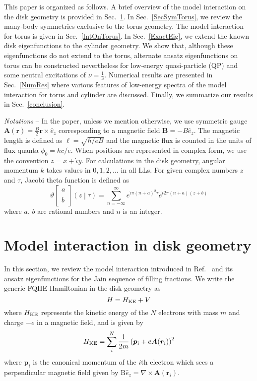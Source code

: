 \documentclass[prb,aps,epsfig,longbibliography,twocolumn]{revtex4-1}
\newcommand{\bsym}[1]{\boldsymbol{#1}}
\newcommand{\rbkt}[1]{\left( #1\right)}
\newcommand{\sbkt}[1]{\left[ #1\right]}
\newcommand{\jbkt}[2]{\left( #1 \middle| #2\right)}
\newcommand{\rtheta}[4]{\vartheta \sbkt{ \substack{{#1} \\ \\{#2}}}	\jbkt{#3}{#4}}
\newcommand{\iiota}{\dot{\iota}}
\begin{document}
This paper is organized as follows. A brief overview of the model interaction on the disk geometry is provided in Sec.~\ref{SecModelInt}. In Sec.~\ref{SecSymTorus}, we review the many-body symmetries exclusive to the torus geometry. The model interaction for torus is given in Sec.~\ref{IntOnTorus}. 
%
In Sec.~\ref{ExactEig}, we extend the known disk eigenfunctions to the cylinder geometry. We show that, although these eigenfunctions do not extend to the torus, alternate ansatz eigenfunctions on torus can be constructed nevertheless for low-energy quasi-particle (QP) and some neutral excitations of $\nu=\frac{1}{3}$. 
%
Numerical results are presented in Sec.~\ref{NumRes} where various features of low-energy spectra of the model interaction for torus and cylinder are discussed. 
%
Finally, we summarize our results in Sec.~\ref{conclusion}.

\textit{Notations} -- In the paper, unless we mention otherwise, we use symmetric gauge $\bsym{A}(\bsym{r}) =\frac{B}{2}\bsym{r}\times \hat{e}_z$ corresponding to a magnetic field $\bsym{B}=-B\hat{e}_z$. The magnetic length is defined as $\ell=\sqrt{\hbar/eB}$ and the magnetic flux is counted in the units of flux quanta $\phi_0=hc/e$. When positions are represented in complex form, we use the convention $z=x+\iiota y$. For calculations in the disk geometry, angular momentum $k$ takes values in $0,1,2,\dots$ in all LLs. For given complex numbers $z$ and $\tau$, Jacobi theta function\cite{Mum83} is defined as
\begin{equation}
\rtheta{a}{b}{z}{\tau}= \sum_{n=-\infty}^{\infty}e^{\iiota \pi(n+a)^2\tau}e^{\iiota 2\pi(n+a)(z+b)} 
\end{equation}
where $a,\,b$ are rational numbers and $n$ is an integer.

\section{Model interaction in disk geometry} \label{SecModelInt}

In this section, we review the model interaction introduced in Ref.~ and its ansatz eigenfunctions for the Jain sequence of filling fractions. We write the generic FQHE Hamiltonian in the disk geometry as
\begin{equation}
H = H_{\rm KE} + V \label{DiscHamiltonian}
\end{equation}
where $H_{\rm KE}$ represents the kinetic energy of the $N$ electrons with mass $m$ and charge $-e$ in a magnetic field, and is given by
\begin{equation}
H_{\rm KE} = \sum_{i}^N \frac{1}{2m}\rbkt{\bsym{p}_i + e\bsym{A}(\bsym{r}_i)}^2
\end{equation}
where $\bsym{p}_i$ is the canonical momentum of the $i$th electron which sees a perpendicular magnetic field given by $\text{B}\hat{e}_z= \nabla \times \bsym{A}(\bsym{r}_i)$.
\end{document}
